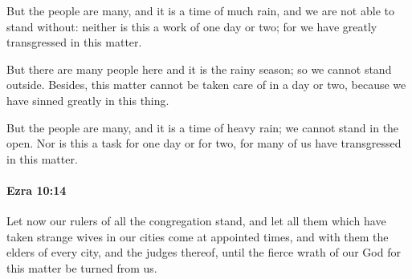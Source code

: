 			\begin{versebox}
					\item[BHS] 
					\item[LXX] 
					\item[ASV] But the people are many, and it is a time of much rain, and we are not able to stand without: neither is this a work of one day or two; for we have greatly transgressed in this matter.
					\item[NIV] But there are many people here and it is the rainy season; so we cannot stand outside. Besides, this matter cannot be taken care of in a day or two, because we have sinned greatly in this thing.
					\item[NRSV] But the people are many, and it is a time of heavy rain; we cannot stand in the open. Nor is this a task for one day or for two, for many of us have transgressed in this matter.
			\end{versebox}

		\paragraph{Ezra 10:14} %
			\label{EZRA-10-14}

			Let now our rulers of all the congregation stand, and let all them which have taken strange wives in our cities come at appointed times, and with them the elders of every city, and the judges thereof, until the fierce wrath of our God for this matter be turned from us.

